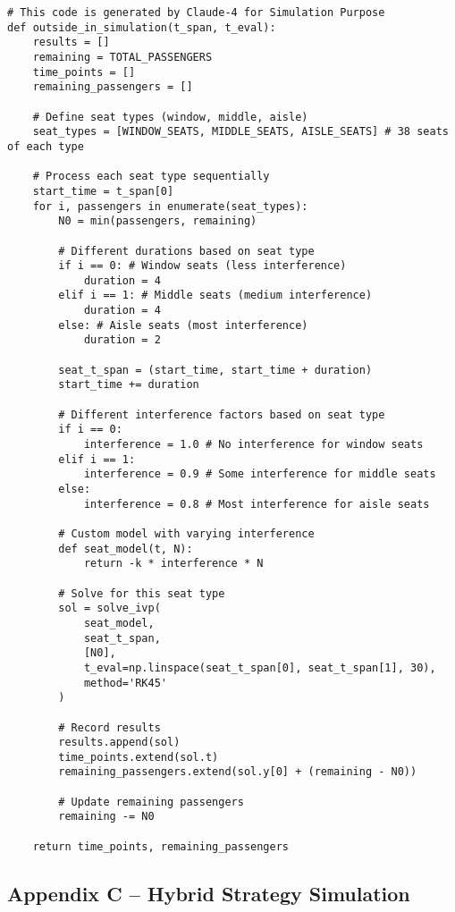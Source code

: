 \documentclass[12pt]{article}
\begin{document}
\begin{verbatim}
# This code is generated by Claude-4 for Simulation Purpose
def outside_in_simulation(t_span, t_eval):
    results = []
    remaining = TOTAL_PASSENGERS
    time_points = []
    remaining_passengers = []
    
    # Define seat types (window, middle, aisle)
    seat_types = [WINDOW_SEATS, MIDDLE_SEATS, AISLE_SEATS] # 38 seats of each type
    
    # Process each seat type sequentially
    start_time = t_span[0]
    for i, passengers in enumerate(seat_types):
        N0 = min(passengers, remaining)
        
        # Different durations based on seat type
        if i == 0: # Window seats (less interference)
            duration = 4
        elif i == 1: # Middle seats (medium interference)
            duration = 4
        else: # Aisle seats (most interference)
            duration = 2
            
        seat_t_span = (start_time, start_time + duration)
        start_time += duration
        
        # Different interference factors based on seat type
        if i == 0:
            interference = 1.0 # No interference for window seats
        elif i == 1:
            interference = 0.9 # Some interference for middle seats
        else:
            interference = 0.8 # Most interference for aisle seats
            
        # Custom model with varying interference
        def seat_model(t, N):
            return -k * interference * N
            
        # Solve for this seat type
        sol = solve_ivp(
            seat_model,
            seat_t_span,
            [N0],
            t_eval=np.linspace(seat_t_span[0], seat_t_span[1], 30),
            method='RK45'
        )
        
        # Record results
        results.append(sol)
        time_points.extend(sol.t)
        remaining_passengers.extend(sol.y[0] + (remaining - N0))
        
        # Update remaining passengers
        remaining -= N0
        
    return time_points, remaining_passengers
\end{verbatim}

\subsection{Appendix C – Hybrid Strategy Simulation}
\end{document}
